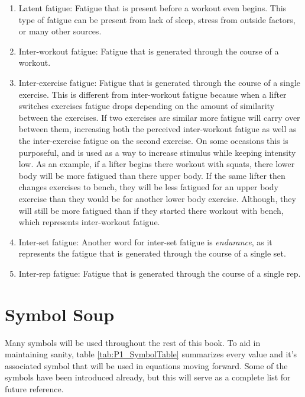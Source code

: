 \begin{enumerate}
	\item Latent fatigue: Fatigue that is present before a workout even begins. This type of fatigue can be present from lack of sleep, stress from outside factors, or many other sources.
	\item Inter-workout fatigue: Fatigue that is generated through the course of a workout.
	\item Inter-exercise fatigue: Fatigue that is generated through the course of a single exercise. This is different from inter-workout fatigue because when a lifter switches exercises fatigue drops depending on the amount of similarity between the exercises. If two exercises are similar more fatigue will carry over between them, increasing both the perceived inter-workout fatigue as well as the inter-exercise fatigue on the second exercise. On some occasions this is purposeful, and is used as a way to increase stimulus while keeping intensity low. As an example, if a lifter begins there workout with squats, there lower body will be more fatigued than there upper body. If the same lifter then changes exercises to bench, they will be less fatigued for an upper body exercise than they would be for another lower body exercise. Although, they will still be more fatigued than if they started there workout with bench, which represents inter-workout fatigue.
	\item Inter-set fatigue: Another word for inter-set fatigue is \textit{endurance}, as it represents the fatigue that is generated through the course of a single set.
	\item Inter-rep fatigue: Fatigue that is generated through the course of a single rep.
\end{enumerate}


\section{Symbol Soup}
\label{sec:P1_SymbolList}

Many symbols will be used throughout the rest of this book. To aid in maintaining sanity, table \ref{tab:P1_SymbolTable} summarizes every value and it's associated symbol that will be used in equations moving forward. Some of the symbols have been introduced already, but this will serve as a complete list for future reference.

